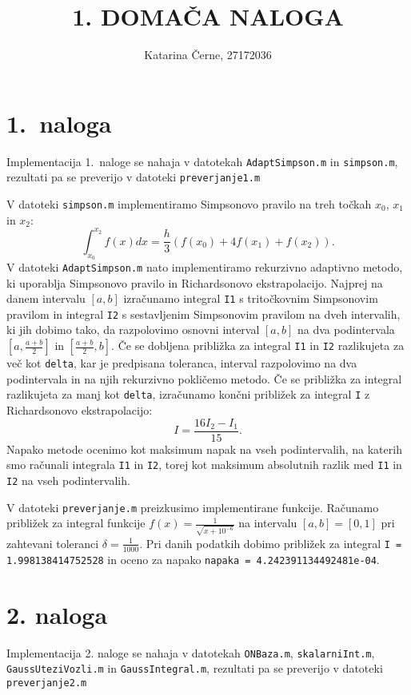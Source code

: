 \documentclass[a4paper,12pt]{article}
\begin{document}
\title{1. DOMAČA NALOGA}
\author{Katarina Černe, 27172036}
\maketitle

\section*{1.\ naloga}

Implementacija 1.\ naloge se nahaja v datotekah \texttt{AdaptSimpson.m} in \texttt{simpson.m}, rezultati pa se preverijo v datoteki \texttt{preverjanje1.m}

V datoteki \texttt{simpson.m} implementiramo Simpsonovo pravilo na treh točkah $x_0$, $x_1$ in $x_2$:
$$\int_{x_0}^{x_2}f(x) dx = \frac{h}{3}(f(x_0)+4f(x_1)+f(x_2)).$$
V datoteki \texttt{AdaptSimpson.m} nato implementiramo rekurzivno adaptivno metodo, ki uporablja Simpsonovo pravilo in Richardsonovo ekstrapolacijo. Najprej na danem intervalu $[a,b]$ izračunamo integral \texttt{I1} s tritočkovnim Simpsonovim pravilom in integral \texttt{I2} s sestavljenim Simpsonovim pravilom na dveh intervalih, ki jih dobimo tako, da razpolovimo osnovni interval $[a,b]$ na dva podintervala $[a,\frac{a+b}{2}]$ in $[\frac{a+b}{2},b]$.
Če se dobljena približka za integral \texttt{I1} in \texttt{I2} razlikujeta za več kot \texttt{delta}, kar je predpisana toleranca, interval razpolovimo na dva podintervala in na njih rekurzivno pokličemo metodo. Če se približka za integral razlikujeta za manj kot \texttt{delta}, izračunamo končni približek za integral \texttt{I} z Richardsonovo ekstrapolacijo:
$$I=\frac{16I_2-I_1}{15}.$$
Napako metode ocenimo kot maksimum napak na vseh podintervalih, na katerih smo računali integrala \texttt{I1} in \texttt{I2}, torej kot maksimum absolutnih razlik med \texttt{I1} in \texttt{I2} na vseh podintervalih.

V datoteki \texttt{preverjanje.m} preizkusimo implementirane funkcije. Računamo približek za integral funkcije $f(x)=\frac{1}{\sqrt{x+10^{-6}}}$ na intervalu $[a,b]=[0,1]$ pri zahtevani toleranci $\delta = \frac{1}{1000}$.
Pri danih podatkih dobimo približek za integral \texttt{I = 1.998138414752528} in oceno za napako \texttt{napaka = 4.242391134492481e-04}.

\section*{2. naloga}

Implementacija 2. naloge se nahaja v datotekah \texttt{ONBaza.m}, \texttt{skalarniInt.m}, 
\texttt{GaussUteziVozli.m} 
in \texttt{GaussIntegral.m}, rezultati pa se preverijo v datoteki \texttt{preverjanje2.m}
\end{document}
